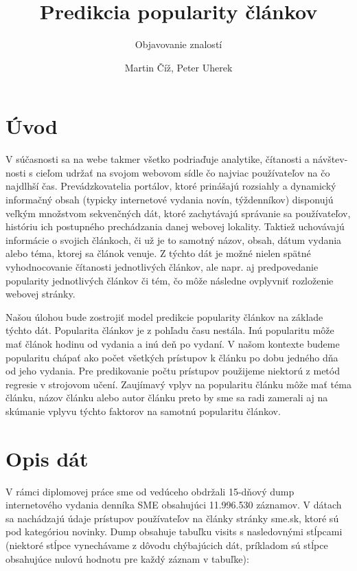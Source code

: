 \documentclass[runningheads,a4paper]{llncs}
\begin{document}
\title{Predikcia popularity článkov}
\subtitle{Objavovanie znalostí}
\author{Martin Číž, Peter Uherek}
\maketitle


\section{Úvod}

V súčasnosti sa na webe takmer všetko podriaďuje analytike, čítanosti a 
návštev-nosti s cieľom udržať na svojom webovom sídle čo najviac používateľov na 
čo najdlhší čas. Prevádzkovatelia portálov, ktoré prinášajú rozsiahly a 
dynamický informačný obsah (typicky internetové vydania novín, týždenníkov) 
disponujú veľkým množstvom sekvenčných dát, ktoré zachytávajú správanie sa 
používateľov, históriu ich postupného prechádzania danej webovej lokality. 
Taktiež uchovávajú informácie o svojich článkoch, či už je to samotný názov, 
obsah, dátum vydania alebo téma, ktorej sa článok venuje. Z týchto dát je možné 
nielen spätné vyhodnocovanie čítanosti jednotlivých článkov, ale napr. aj 
predpovedanie popularity jednotlivých článkov či tém, čo môže následne ovplyvniť 
rozloženie webovej stránky. 


Našou úlohou bude zostrojiť model predikcie popularity článkov na základe týchto dát. Popularita článkov je z pohľadu času nestála. Inú popularitu môže mať článok hodinu od vydania a inú deň po vydaní. V našom kontexte budeme popularitu chápať ako počet všetkých prístupov k článku po dobu jedného dňa od jeho vydania. Pre predikovanie počtu prístupov použijeme niektorú z metód regresie v strojovom učení. Zaujímavý vplyv na popularitu článku môže mať téma článku, názov článku alebo autor článku preto by sme sa radi zamerali aj na skúmanie vplyvu týchto faktorov na samotnú popularitu článkov.



\section{Opis dát}
V rámci diplomovej práce sme od vedúceho obdržali 15-dňový dump 
internetového vydania denníka SME obsahujúci 11.996.530 záznamov. V dátach sa 
nachádzajú údaje prístupov používateľov na články stránky sme.sk, ktoré sú pod 
kategóriou novinky. Dump obsahuje tabuľku visits s nasledovnými stĺpcami 
(niektoré stĺpce vynechávame z dôvodu chýbajúcich dát, príkladom sú stĺpce 
obsahujúce nulovú hodnotu pre každý záznam v tabuľke):
\end{document}
